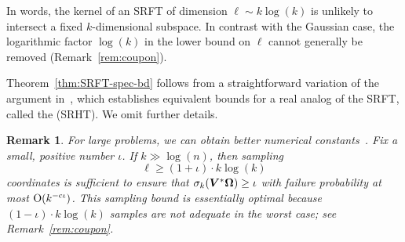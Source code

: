 \documentclass[final]{siamltex}
\newcommand{\notate}[1]{\textcolor{red}{\textbf{[#1]}}}
\newtheorem{remark}{Remark}[section]
\begin{document}



\lsp

In words, the kernel of an SRFT of dimension $\ell \sim k \log(k)$ is unlikely to intersect a fixed $k$-dimensional subspace. In contrast
with the Gaussian case, the logarithmic factor $\log(k)$ in the lower
bound on $\ell$ cannot generally be removed (Remark~\ref{rem:coupon}).

Theorem~\ref{thm:SRFT-spec-bd} follows from a straightforward variation of the argument in~\cite{Tro10:Improved-Analysis}, which establishes equivalent bounds for a real analog of the SRFT, called the  (SRHT).  We omit further details.




\lsp

\begin{remark} \rm
For large problems, we can obtain better numerical constants~\cite[Thm.~3.2]{Tro10:Improved-Analysis}.
Fix a small, positive number $\iota$.  If $k \gg \log(n)$, then sampling
$$
\ell \geq (1 + \iota) \cdot k \log(k)
$$
coordinates is sufficient to ensure that $\sigma_k(\bm{V}^* \bm{\Omega}) \geq \iota$ with failure probability at most $\mathrm{O}(k^{-\mathrm{c}\iota})$.  This sampling bound is essentially optimal because $(1 - \iota) \cdot k \log(k)$ samples are not adequate in the worst case; see Remark~\ref{rem:coupon}.
\end{remark}
\lsp
\end{document}
